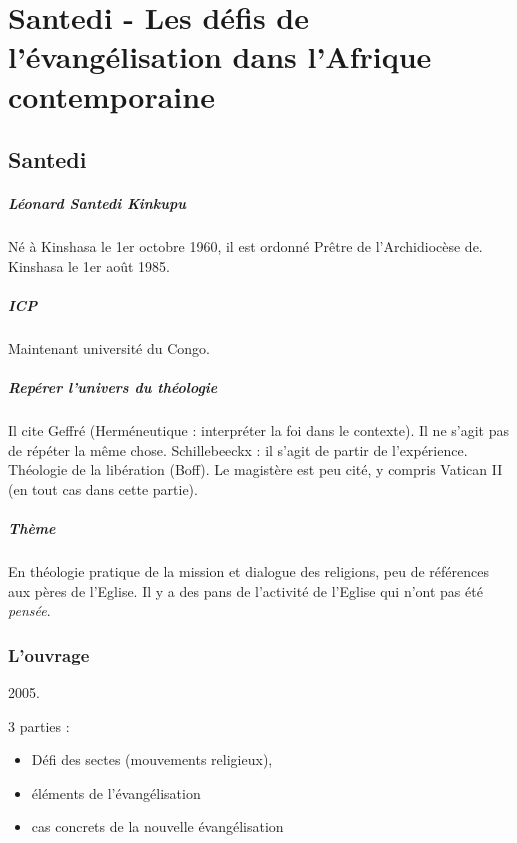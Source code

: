 \chapter{Santedi - Les défis de l'évangélisation
dans
l'Afrique contemporaine }

\section{Santedi}

\paragraph{Léonard Santedi Kinkupu }  Né à Kinshasa le 1er octobre 1960, il  est ordonné Prêtre de l'Archidiocèse de. Kinshasa le 1er août 1985.

\paragraph{ICP } Maintenant université du Congo. 




\paragraph{Repérer l'univers du théologie} Il cite Geffré (Herméneutique : interpréter la foi dans le contexte). Il ne s'agit pas de répéter la même chose. Schillebeeckx : il s'agit de partir de l'expérience.  
Théologie de la libération (Boff). Le magistère est peu cité, y compris Vatican II (en tout cas dans cette partie). 

\paragraph{Thème} En théologie pratique de la mission et dialogue des religions, peu de références aux pères de l'Eglise. Il y a des pans de l'activité de l'Eglise qui n'ont pas été \textit{pensée}. 

\subsection{L'ouvrage}

2005.

3 parties : 
\begin{itemize}
    \item Défi des sectes (mouvements religieux), 
    \item éléments de l'évangélisation

    \item cas concrets de la nouvelle évangélisation
\end{itemize}

